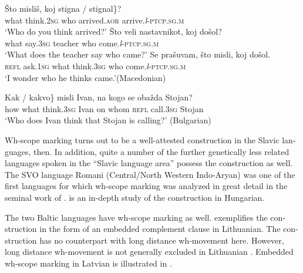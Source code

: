 \documentclass[output=paper,colorlinks,citecolor=brown]{langscibook}
\begin{document}
\begin{otherlanguage}{english}
\ea\label{ex:fanselow:24}
\ea     
\gll Što 	misliš, 		koj 	\minsp{\{} stigna / stignal\}? \\
what 	think.2\textsc{sg}  	who 	{} arrived.\textsc{aor} {} arrive.\textit{l}-\textsc{ptcp}.\textsc{sg}.\textsc{m}  \\
\glt ‘Who do you think arrived?'
\label{ex:fanselow:24a}
\ex     
\gll  Što 	veli 	nastavnikot, 	koj 	došol? \\
what 	say.3\textsc{sg} 	teacher 	who 	come.\textit{l}-\textsc{ptcp}.\textsc{sg}.\textsc{m} \\
\glt ‘What does the teacher say who came?'
\label{ex:fanselow:24b}
\ex     
\gll Se 	prašuvam, 	što 	misli, 	koj 	došol. \\
\textsc{refl}	ask.1\textsc{sg} 	what 	think.3\textsc{sg} who 	come.\textit{l}-\textsc{ptcp}.\textsc{sg}.\textsc{m} \\
\glt ‘I wonder who he thinks came.'\hfill (Macedonian)\label{ex:fanselow:24c}
\z\z

\ea \label{ex:fanselow:25}
\gll  \minsp{\{} Kak / kakvo\}  	misli  	Ivan, 	na 	kogo 	se  	obažda 	Stojan? \\
    {} how {} what 	think.3\textsc{sg} 	Ivan	on 	whom 	\textsc{refl} 	call.3\textsc{sg}	Stojan \\
    \glt    ‘Who does Ivan think that Stojan is calling?' \hfill (Bulgarian)
    \z

\noindent Wh-scope marking turns out to be a well-attested construction in the Slavic languages, then. In addition, quite a number of the further genetically less related languages spoken in the “Slavic language area” possess the construction as well. The SVO language Romani (Central/North Western Indo-Aryan) was one of the first languages for which wh-scope marking was analyzed in great detail in the seminal work of \citet{McDaniel1989}. \citet{Horvath1997} is an in-depth study of the construction in Hungarian.

The two Baltic languages have wh-scope marking as well.  exemplifies the construction in the form of an embedded complement clause in Lithuanian. The construction has no counterpart with long distance wh-movement here. However, long distance wh-movement is not generally excluded in Lithuanian . Embedded wh-scope marking in Latvian is illustrated in .



\end{otherlanguage}
\end{document}
